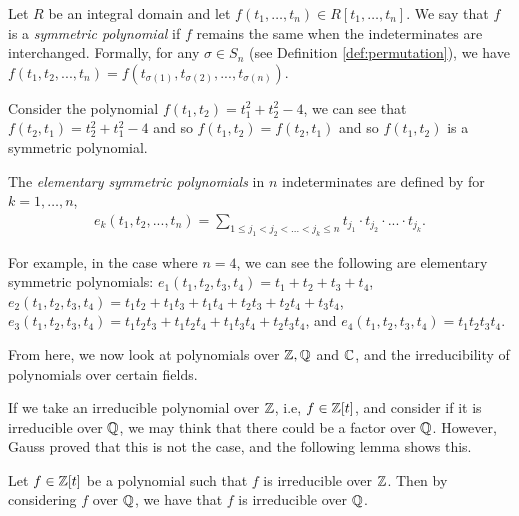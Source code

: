 \begin{definition}
	Let $R$ be an integral domain and let $f(t_1, \dots, t_n) \in R[t_1, \dots, t_n]$. We say that $f$ is
    a \textit{symmetric polynomial} if $f$ remains the same when the indeterminates are interchanged. 
    Formally, for any $\sigma \in S_n$ (see Definition \ref{def:permutation}), we have $f(t_1,t_2,...,t_n) = f(t_{\sigma(1)},t_{\sigma(2)},...,t_{\sigma(n)})$.
\end{definition}

\begin{example}
    Consider the polynomial 
    $f(t_1,t_2)=t_1^2+t_2^2-4$, we can see that $f(t_2,t_1)=t_2^2+t_1^2-4$ and so $f(t_1,t_2)=f(t_2,t_1)$ and so $f(t_1,t_2)$ is a symmetric polynomial.
\end{example}

\begin{definition}
    The \textit{elementary symmetric polynomials} in $n$ indeterminates are defined by for $k = 1, \dots, n$,
    \begin{align*}
    e_k(t_1,t_2,...,t_n) = \sum_{1\leq j_1<j_2<...<j_k\leq n} t_{j_1}\cdot t_{j_2} \cdot ... \cdot t_{j_k}.
    \end{align*}
\end{definition}

\begin{example}
    For example, in the case where $n=4$, we can see the following are elementary symmetric polynomials: $e_1(t_1,t_2,t_3,t_4) = t_1 + t_2 + t_3 + t_4$, $e_2(t_1, t_2, t_3, t_4) = t_1t_2 + t_1t_3 + t_1t_4 + t_2t_3 + t_2t_4 + t_3t_4$,  $e_3(t_1,t_2,t_3,t_4) = t_1t_2t_3+t_1t_2t_4+t_1t_3t_4+t_2t_3t_4$, and $e_4(t_1, t_2, t_3, t_4) = t_1 t_2 t_3 t_4$. 
\end{example}

From here, we now look at polynomials over $\mathbb Z, \mathbb Q$ and $\mathbb C$, and the irreducibility of polynomials over certain fields.

If we take an irreducible polynomial over $\mathbb Z$, i.e, $f \in \mathbb Z[t]$, and consider if it is irreducible over $\mathbb Q$, we may think that there could be a factor over $\mathbb Q$. However, Gauss proved that this is not the case, and the following lemma shows this.

\begin{lemma} \label{lemma:gauss}
     Let $f \in \mathbb Z[t]$ be a polynomial such that $f$ is irreducible over $\mathbb Z$. Then by considering $f$ over $\mathbb Q$, we have that $f$ is irreducible over $\mathbb Q$.
    
\end{lemma}

